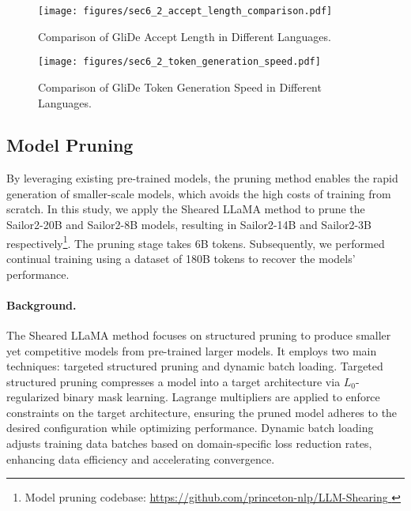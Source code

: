 \begin{figure}[htbp]
    \centering
    \texttt{[image: figures/sec6\_2\_accept\_length\_comparison.pdf]}
    \caption{
    Comparison of GliDe Accept Length in Different Languages.
    }
    \label{fig:glide_accept_length}
\end{figure}

\begin{figure}[htbp]
    \centering
    \texttt{[image: figures/sec6\_2\_token\_generation\_speed.pdf]}
    \caption{
    Comparison of GliDe Token Generation Speed in Different Languages.
    }
    \label{fig:glide_speed}
\end{figure}

\subsection{Model Pruning}

By leveraging existing pre-trained models, the pruning method enables the rapid generation of smaller-scale models, 
which avoids the high costs of training from scratch. In this study, we apply the Sheared LLaMA method\citep{xia2023sheared} to prune the Sailor2-20B and Sailor2-8B models, resulting in Sailor2-14B and Sailor2-3B respectively\footnote{Model pruning codebase: \url{https://github.com/princeton-nlp/LLM-Shearing }}. 
The pruning stage takes 6B tokens.
Subsequently, we performed continual training using a dataset of 180B tokens to recover the models' performance.

\paragraph{Background.} The Sheared LLaMA method focuses on structured pruning to produce smaller yet competitive models from pre-trained larger models. It employs two main techniques: targeted structured pruning and dynamic batch loading.  
Targeted structured pruning compresses a model into a target architecture via $L_0$-regularized binary mask learning.
Lagrange multipliers are applied to enforce constraints on the target architecture, ensuring the pruned model adheres to the desired configuration while optimizing performance. Dynamic batch loading adjusts training data batches based on domain-specific loss reduction rates, enhancing data efficiency and accelerating convergence.

